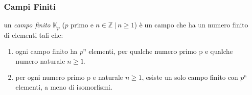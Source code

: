\documentclass{article}
\newcommand{\Kp}{\mathbb{K}_{p}}
\begin{document}

\subsubsection{Campi Finiti}
un \textit{campo finito} $\Kp$ ($p$ primo e $n \in \mathbb{Z} \ | \ n \ge 1$) è un campo che ha un numero finito di elementi tali che:

\begin{enumerate}
    \item ogni campo finito ha $p^{n}$ elementi, per qualche numero primo p e qualche numero naturale $n \ge 1$.
    \item per ogni numero primo p e naturale $n \ge 1$, esiste un solo campo finito con $p^{n}$ elementi, a meno di isomorfismi.
\end{enumerate}










\end{document}

